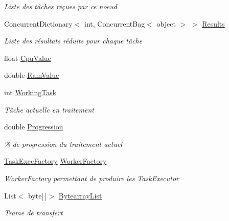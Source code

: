 \begin{DoxyCompactItemize}
\begin{DoxyCompactList}\small\item\em Liste des tâches reçues par ce noeud \end{DoxyCompactList}\item 
Concurrent\+Dictionary$<$ int, Concurrent\+Bag$<$ object $>$ $>$ \hyperlink{class_node_net_1_1_network_1_1_nodes_1_1_node_a27c9abae66af40b58d906eb3dca72646}{Results}
\begin{DoxyCompactList}\small\item\em Liste des résultats réduits pour chaque tâche \end{DoxyCompactList}\item 
float \hyperlink{class_node_net_1_1_network_1_1_nodes_1_1_node_ae9361f5398f580558130321351f60769}{Cpu\+Value}
\item 
double \hyperlink{class_node_net_1_1_network_1_1_nodes_1_1_node_a2ffe8e246abf2e153a220ed96c15f4de}{Ram\+Value}
\item 
int \hyperlink{class_node_net_1_1_network_1_1_nodes_1_1_node_a3394c5d0091b37680c3dc3868e369a7a}{Working\+Task}
\begin{DoxyCompactList}\small\item\em Tâche actuelle en traitement \end{DoxyCompactList}\item 
double \hyperlink{class_node_net_1_1_network_1_1_nodes_1_1_node_a215d9270752581ba186656703bfcd755}{Progression}
\begin{DoxyCompactList}\small\item\em \% de progression du traitement actuel \end{DoxyCompactList}\item 
\hyperlink{class_node_net_1_1_tasks_1_1_task_exec_factory}{Task\+Exec\+Factory} \hyperlink{class_node_net_1_1_network_1_1_nodes_1_1_node_ab4815fbf678140a67bc54996fe8e6c0b}{Worker\+Factory}
\begin{DoxyCompactList}\small\item\em Worker\+Factory permettant de produire les Task\+Executor \end{DoxyCompactList}\item 
List$<$ byte\mbox{[}$\,$\mbox{]}$>$ \hyperlink{class_node_net_1_1_network_1_1_nodes_1_1_node_a2492a4dacdd9b3e84eb7dbd4df35ae10}{Bytearray\+List}
\begin{DoxyCompactList}\small\item\em Trame de transfert \end{DoxyCompactList}\end{DoxyCompactItemize}


